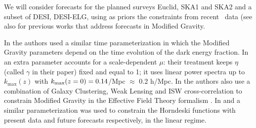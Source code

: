  We will consider forecasts for the planned surveys Euclid, SKA1 and SKA2 and a subset of DESI, DESI-ELG, using as priors the
constraints from recent \planck\ data (see also \cite{Alonso2016, hojjati_cosmological_2012, baker_observational_2015, bull_extending_2015, Gleyzes2016} for previous works that address forecasts in Modified Gravity.


In \cite{bull_extending_2015, Gleyzes2016, Alonso2016} the authors used a similar time parameterization in which the Modified Gravity
parameters depend on the time evolution of the dark energy fraction. In \cite{bull_extending_2015} an extra parameter accounts for a scale-dependent $\mu$: their treatment keeps $\eta$ (called $\gamma$ in their paper) fixed and equal to 1; it uses linear power spectra up to $k_{\mathrm{max}}(z)$ with $k_{\rm max}(z=0)=0.14$/Mpc $\approx$ 0.2 h/Mpc. 
In \cite{Gleyzes2016} the authors also use a combination of Galaxy Clustering, Weak Lensing and ISW cross-correlation to constrain
Modified Gravity in the Effective Field Theory formalism \cite{Gubitosi2013}. In \cite{Bellini2016} and \cite{Alonso2016} a similar parameterization was used to constrain the Horndeski functions \cite{Bellini2014} with present data and future forecasts respectively, in the linear regime.

